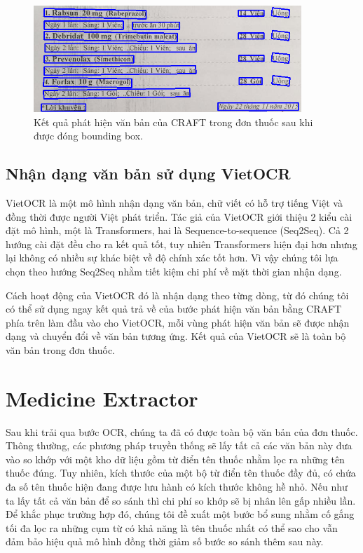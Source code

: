 \begin{figure}
\centering
\includegraphics[width=0.9\textwidth]{mep_img/craft_pres_1.png}
\caption{Kết quả phát hiện văn bản của CRAFT trong đơn thuốc sau khi được đóng bounding box.}\label{fig_craft_pres_1}
\end{figure}

\subsection{Nhận dạng văn bản sử dụng VietOCR}

VietOCR \cite{VietOCR} là một mô hình nhận dạng văn bản, chữ viết có hỗ trợ tiếng Việt và đồng thời được người Việt phát triển. Tác giả của VietOCR giới thiệu 2 kiểu cài đặt mô hình, một là Transformers, hai là Sequence-to-sequence (Seq2Seq). Cả 2 hướng cài đặt đều cho ra kết quả tốt, tuy nhiên Transformers hiện đại hơn nhưng lại không có nhiều sự khác biệt về độ chính xác tốt hơn. Vì vậy chúng tôi lựa chọn theo hướng Seq2Seq nhằm tiết kiệm chi phí về mặt thời gian nhận dạng. 

Cách hoạt động của VietOCR đó là nhận dạng theo từng dòng, từ đó chúng tôi có thể sử dụng ngay kết quả trả về của bước phát hiện văn bản bằng CRAFT phía trên làm đầu vào cho VietOCR, mỗi vùng phát hiện văn bản sẽ được nhận dạng và chuyển đổi về văn bản tương ứng. Kết quả của VietOCR sẽ là toàn bộ văn bản trong đơn thuốc.

\section{Medicine Extractor}

Sau khi trải qua bước OCR, chúng ta đã có được toàn bộ văn bản của đơn thuốc. Thông thường, các phương pháp truyền thống sẽ lấy tất cả các văn bản này đưa vào so khớp với một kho dữ liệu gồm từ điển tên thuốc nhằm lọc ra những tên thuốc đúng. Tuy nhiên, kích thước của một bộ từ điển tên thuốc đầy đủ, có chứa đa số tên thuốc hiện đang được lưu hành có kích thước không hề nhỏ. Nếu như ta lấy tất cả văn bản để so sánh thì chi phí so khớp sẽ bị nhân lên gấp nhiều lần. Để khắc phục trường hợp đó, chúng tôi đề xuất một bước bổ sung nhằm cố gắng tối đa lọc ra những cụm từ có khả năng là tên thuốc nhất có thể sao cho vẫn đảm bảo hiệu quả mô hình đồng thời giảm số bước so sánh thêm sau này.

